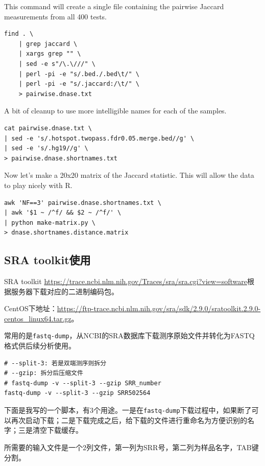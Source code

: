 \documentclass[]{article}
\numberwithin{figure}{section}
\numberwithin{table}{section}
\begin{document}
This command will create a single file containing the pairwise Jaccard measurements from all 400 tests.

\begin{verbatim}
find . \
    | grep jaccard \
    | xargs grep "" \
    | sed -e s"/\.\///" \
    | perl -pi -e "s/.bed./.bed\t/" \
    | perl -pi -e "s/.jaccard:/\t/" \
    > pairwise.dnase.txt
\end{verbatim}

A bit of cleanup to use more intelligible names for each of the samples.

\begin{verbatim}
cat pairwise.dnase.txt \
| sed -e 's/.hotspot.twopass.fdr0.05.merge.bed//g' \
| sed -e 's/.hg19//g' \
> pairwise.dnase.shortnames.txt
\end{verbatim}

Now let's make a 20x20 matrix of the Jaccard statistic. This will allow the data to play nicely with R.

\begin{verbatim}
awk 'NF==3' pairwise.dnase.shortnames.txt \
| awk '$1 ~ /^f/ && $2 ~ /^f/' \
| python make-matrix.py \
> dnase.shortnames.distance.matrix
\end{verbatim}

\hypertarget{sra_tools}{%
\subsection{SRA toolkit使用}\label{sra_tools}}

SRA toolkit \url{https://trace.ncbi.nlm.nih.gov/Traces/sra/sra.cgi?view=software}根据服务器下载对应的二进制编码包。

CentOS下地址：\url{https://ftp-trace.ncbi.nlm.nih.gov/sra/sdk/2.9.0/sratoolkit.2.9.0-centos_linux64.tar.gz}。

常用的是\texttt{fastq-dump}，从NCBI的SRA数据库下载测序原始文件并转化为FASTQ格式供后续分析使用。

\begin{verbatim}
# --split-3: 若是双端测序则拆分
# --gzip: 拆分后压缩文件
# fastq-dump -v --split-3 --gzip SRR_number
fastq-dump -v --split-3 --gzip SRR502564
\end{verbatim}

下面是我写的一个脚本，有3个用途。一是在\texttt{fastq-dump}下载过程中，如果断了可以再次启动下载；二是下载完成之后，给下载的文件进行重命名为方便识别的名字；三是清空下载缓存。

所需要的输入文件是一个2列文件，第一列为SRR号，第二列为样品名字，TAB键分割。
\end{document}
